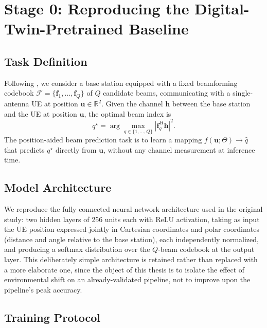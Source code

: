 \documentclass{iutbscthesis}
\begin{document}
\section{Stage 0: Reproducing the Digital-Twin-Pretrained Baseline}
\label{sec:stage0}

\subsection{Task Definition}

Following \textcite{jiang2023digitaltwinbeam}, we consider a base station equipped with a fixed beamforming codebook $\mathcal{F} = \{\mathbf{f}_1, \dots, \mathbf{f}_Q\}$ of $Q$ candidate beams, communicating with a single-antenna UE at position $\mathbf{u} \in \mathbb{R}^2$. Given the channel $\mathbf{h}$ between the base station and the UE at position $\mathbf{u}$, the optimal beam index is
\begin{equation}
    q^\star = \arg\max_{q \in \{1, \dots, Q\}} \left| \mathbf{f}_q^{H} \mathbf{h} \right|^2 .
    \label{eq:optimalbeam}
\end{equation}
The position-aided beam prediction task is to learn a mapping $f(\mathbf{u}; \Theta) \to \hat{q}$ that predicts $q^\star$ directly from $\mathbf{u}$, without any channel measurement at inference time.

\subsection{Model Architecture}

We reproduce the fully connected neural network architecture used in the original study: two hidden layers of 256 units each with ReLU activation, taking as input the UE position expressed jointly in Cartesian coordinates and polar coordinates (distance and angle relative to the base station), each independently normalized, and producing a softmax distribution over the $Q$-beam codebook at the output layer. This deliberately simple architecture is retained rather than replaced with a more elaborate one, since the object of this thesis is to isolate the effect of environmental shift on an already-validated pipeline, not to improve upon the pipeline's peak accuracy.

\subsection{Training Protocol}
\end{document}
